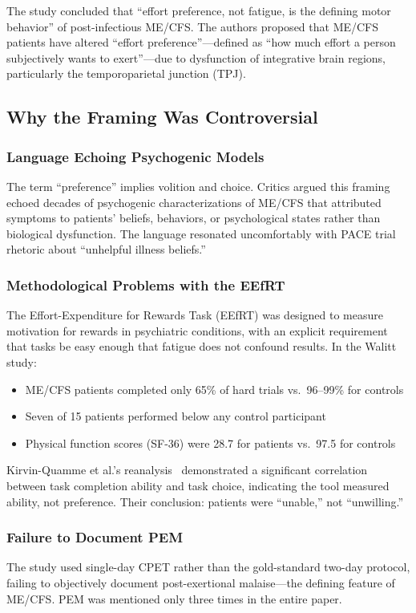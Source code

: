 The study concluded that ``effort preference, not fatigue, is the defining motor behavior'' of post-infectious ME/CFS. The authors proposed that ME/CFS patients have altered ``effort preference''---defined as ``how much effort a person subjectively wants to exert''---due to dysfunction of integrative brain regions, particularly the temporoparietal junction (TPJ).

\subsection{Why the Framing Was Controversial}

\subsubsection{Language Echoing Psychogenic Models}
The term ``preference'' implies volition and choice. Critics argued this framing echoed decades of psychogenic characterizations of ME/CFS that attributed symptoms to patients' beliefs, behaviors, or psychological states rather than biological dysfunction. The language resonated uncomfortably with PACE trial rhetoric about ``unhelpful illness beliefs.''

\subsubsection{Methodological Problems with the EEfRT}
The Effort-Expenditure for Rewards Task (EEfRT) was designed to measure motivation for rewards in psychiatric conditions, with an explicit requirement that tasks be easy enough that fatigue does not confound results. In the Walitt study:

\begin{itemize}
    \item ME/CFS patients completed only 65\% of hard trials vs.\ 96--99\% for controls
    \item Seven of 15 patients performed below any control participant
    \item Physical function scores (SF-36) were 28.7 for patients vs.\ 97.5 for controls
\end{itemize}

Kirvin-Quamme et al.'s reanalysis~\cite{kirvinquamme2025effort} demonstrated a significant correlation between task completion ability and task choice, indicating the tool measured ability, not preference. Their conclusion: patients were ``unable,'' not ``unwilling.''

\subsubsection{Failure to Document PEM}
The study used single-day CPET rather than the gold-standard two-day protocol, failing to objectively document post-exertional malaise---the defining feature of ME/CFS. PEM was mentioned only three times in the entire paper.

